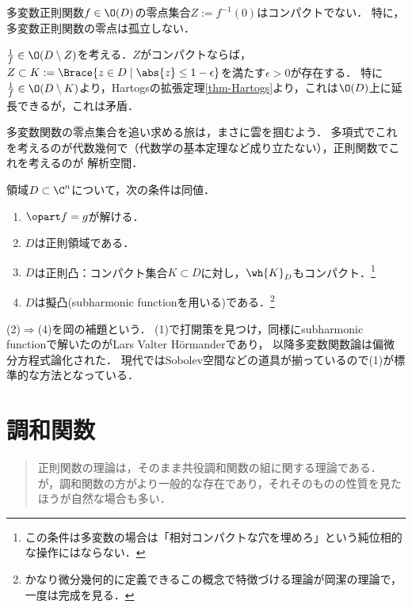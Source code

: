 \documentclass[uplatex, dvipdfmx]{jsreport}
\begin{document}
\begin{corollary}
    多変数正則関数$f\in\O(D)$の零点集合$Z:=f^{-1}(0)$はコンパクトでない．
    特に，多変数正則関数の零点は孤立しない．
\end{corollary}
\begin{Proof}
    $\frac{1}{f}\in\O(D\setminus Z)$を考える．$Z$がコンパクトならば，$Z\subset K:=\Brace{z\in D\mid\abs{z}\le 1-\epsilon}$を満たす$\epsilon>0$が存在する．
    特に$\frac{1}{f}\in\O(D\setminus K)$より，Hartogsの拡張定理\ref{thm-Hartogs}より，これは$\O(D)$上に延長できるが，これは矛盾．
\end{Proof}
\begin{remarks}
    多変数関数の零点集合を追い求める旅は，まさに雲を掴むよう．
    多項式でこれを考えるのが代数幾何で（代数学の基本定理など成り立たない），正則関数でこれを考えるのが
    解析空間．
\end{remarks}

\begin{theorem}
    領域$D\subset\C^n$について，次の条件は同値．
    \begin{enumerate}
        \item $\opart f=g$が解ける．
        \item $D$は正則領域である．
        \item $D$は正則凸：コンパクト集合$K\subset D$に対し，$\wh{K}_D$もコンパクト．\footnote{この条件は多変数の場合は「相対コンパクトな穴を埋めろ」という純位相的な操作にはならない．}
        \item $D$は擬凸(subharmonic functionを用いる)である．\footnote{かなり微分幾何的に定義できるこの概念で特徴づける理論が岡潔の理論で，一度は完成を見る．}
    \end{enumerate}
    (2)$\Rightarrow$(4)を岡の補題という．
    (1)で打開策を見つけ，同様にsubharmonic functionで解いたのがLars Valter Hörmanderであり，
    以降多変数関数論は偏微分方程式論化された．
    現代ではSobolev空間などの道具が揃っているので(1)が標準的な方法となっている．
\end{theorem}

\chapter{調和関数}

\begin{quotation}
    正則関数の理論は，そのまま共役調和関数の組に関する理論である．
    が，調和関数の方がより一般的な存在であり，それそのものの性質を見たほうが自然な場合も多い．
\end{quotation}
\end{document}
